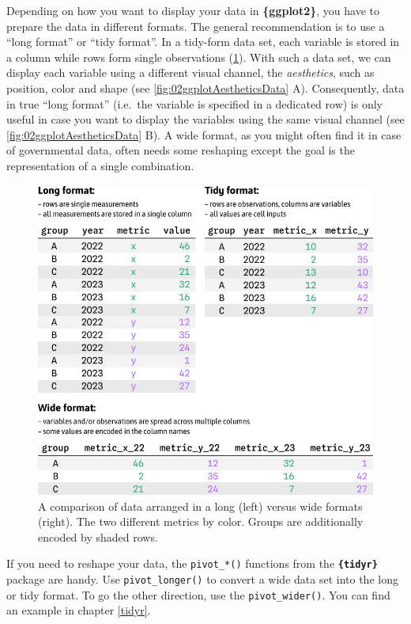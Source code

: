 \documentclass[
]{krantz}
\begin{document}
Depending on how you want to display your data in \textbf{\{ggplot2\}}, you have to prepare the data in different formats. The general recommendation is to use a ``long format'' or ``tidy format''. In a tidy-form data set, each variable is stored in a column while rows form single observations (\ref{fig:02imgFormatLongTidyWide}). With such a data set, we can display each variable using a different visual channel, the \emph{aesthetics}, such as position, color and shape (see \ref{fig:02ggplotAestheticsData} A). Consequently, data in true ``long format'' (i.e.~the variable is specified in a dedicated row) is only useful in case you want to display the variables using the same visual channel (see \ref{fig:02ggplotAestheticsData} B). A wide format, as you might often find it in case of governmental data, often needs some reshaping except the goal is the representation of a single combination.

\begin{figure}
\centering
\includegraphics{./img/table-format-long-tidy-wide.png}
\caption{\label{fig:02imgFormatLongTidyWide}A comparison of data arranged in a long (left) versus wide formats (right). The two different metrics by color. Groups are additionally encoded by shaded rows.}
\end{figure}

If you need to reshape your data, the \texttt{pivot\_*()} functions from the \textbf{\texttt{\{tidyr\}}} package are handy. Use \texttt{pivot\_longer()} to convert a wide data set into the long or tidy format. To go the other direction, use the \texttt{pivot\_wider()}. You can find an example in chapter \ref{tidyr}.
\end{document}
